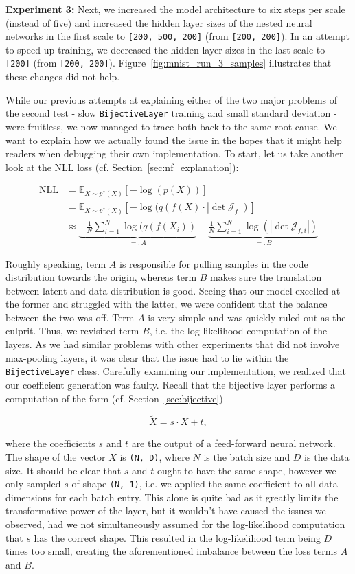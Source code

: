 \textbf{Experiment 3:} Next, we increased the model architecture to six steps per scale (instead of five) and increased the hidden layer sizes of the nested neural networks in the first scale to \verb|[200, 500, 200]| (from \verb|[200, 200]|). In an attempt to speed-up training, we decreased the hidden layer sizes in the last scale to \verb|[200]| (from \verb|[200, 200]|). Figure~\ref{fig:mnist_run_3_samples} illustrates that these changes did not help.

While our previous attempts at explaining either of the two major problems of the second test - slow \texttt{BijectiveLayer} training and small standard deviation - were fruitless, we now managed to trace both back to the same root cause. We want to explain how we actually found the issue in the hopes that it might help readers when debugging their own implementation. To start, let us take another look at the NLL loss (cf. Section~\ref{sec:nf_explanation}):

\begin{align*}
\text{NLL} &= \mathbb{E}_{X \sim p^*(X)} [-\log(p(X))]\\
&= \mathbb{E}_{X \sim p^*(X)} [-\log(q(f(X) \cdot |\det \mathcal{J}_{f}|)]\\
&\approx \underbrace{- \frac{1}{N} \sum_{i=1}^N \log(q(f(X_i))}_{=: A} - \underbrace{\frac{1}{N} \sum_{i=1}^N \log(|\det \mathcal{J}_{f, i}|)}_{=: B}
\end{align*}

Roughly speaking, term $A$ is responsible for pulling samples in the code distribution towards the origin, whereas term $B$ makes sure the translation between latent and data distribution is good. Seeing that our model excelled at the former and struggled with the latter, we were confident that the balance between the two was off. Term $A$ is very simple and was quickly ruled out as the culprit. Thus, we revisited term $B$, i.e. the log-likelihood computation of the layers. As we had similar problems with other experiments that did not involve max-pooling layers, it was clear that the issue had to lie within the \texttt{BijectiveLayer} class. Carefully examining our implementation, we realized that our coefficient generation was faulty. Recall that the bijective layer performs a computation of the form (cf. Section~\ref{sec:bijective})

\[
\tilde{X} = s \cdot X + t,
\]

where the coefficients $s$ and $t$ are the output of a feed-forward neural network. The shape of the vector $X$ is \verb|(N, D)|, where $N$ is the batch size and $D$ is the data size. It should be clear that $s$ and $t$ ought to have the same shape, however we only sampled $s$ of shape \verb|(N, 1)|, i.e. we applied the same coefficient to all data dimensions for each batch entry. This alone is quite bad as it greatly limits the transformative power of the layer, but it wouldn't have caused the issues we observed, had we not simultaneously assumed for the log-likelihood computation that $s$ has the correct shape. This resulted in the log-likelihood term being $D$ times too small, creating the aforementioned imbalance between the loss terms $A$ and $B$.


